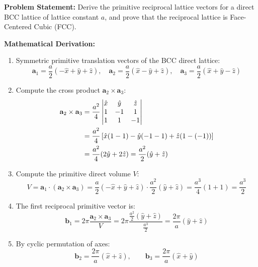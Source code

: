 \documentclass[11pt,a4paper]{article}
\begin{document}
\begin{solbox}
\textbf{Problem Statement:} Derive the primitive reciprocal lattice vectors for a direct BCC lattice of lattice constant $a$, and prove that the reciprocal lattice is Face-Centered Cubic (FCC).

\textbf{Mathematical Derivation:}
\begin{enumerate}
    \item Symmetric primitive translation vectors of the BCC direct lattice:
    \begin{equation}
    \mathbf{a}_1 = \frac{a}{2}(-\hat{x} + \hat{y} + \hat{z}), \quad
    \mathbf{a}_2 = \frac{a}{2}(\hat{x} - \hat{y} + \hat{z}), \quad
    \mathbf{a}_3 = \frac{a}{2}(\hat{x} + \hat{y} - \hat{z})
    \end{equation}
    \item Compute the cross product $\mathbf{a}_2 \times \mathbf{a}_3$:
    \begin{align}
    \mathbf{a}_2 \times \mathbf{a}_3 &= \frac{a^2}{4} \begin{vmatrix} \hat{x} & \hat{y} & \hat{z} \\ 1 & -1 & 1 \\ 1 & 1 & -1 \end{vmatrix} \notag\\
    &= \frac{a^2}{4} \left[ \hat{x}(1-1) - \hat{y}(-1-1) + \hat{z}(1 - (-1)) \right] \notag\\
    &= \frac{a^2}{4} (2\hat{y} + 2\hat{z}) = \frac{a^2}{2}(\hat{y} + \hat{z})
    \end{align}
    \item Compute the primitive direct volume $V$:
    \begin{equation}
    V = \mathbf{a}_1 \cdot (\mathbf{a}_2 \times \mathbf{a}_3) = \frac{a}{2}(-\hat{x} + \hat{y} + \hat{z}) \cdot \frac{a^2}{2}(\hat{y} + \hat{z}) = \frac{a^3}{4}(1 + 1) = \frac{a^3}{2}
    \end{equation}
    \item The first reciprocal primitive vector is:
    \begin{equation}
    \mathbf{b}_1 = 2\pi \frac{\mathbf{a}_2 \times \mathbf{a}_3}{V} = 2\pi \frac{\frac{a^2}{2}(\hat{y} + \hat{z})}{\frac{a^3}{2}} = \frac{2\pi}{a}(\hat{y} + \hat{z})
    \end{equation}
    \item By cyclic permutation of axes:
    \begin{equation}
    \mathbf{b}_2 = \frac{2\pi}{a}(\hat{x} + \hat{z}), \qquad \mathbf{b}_3 = \frac{2\pi}{a}(\hat{x} + \hat{y})

\end{equation}
\end{enumerate}
\end{solbox}
\end{document}
